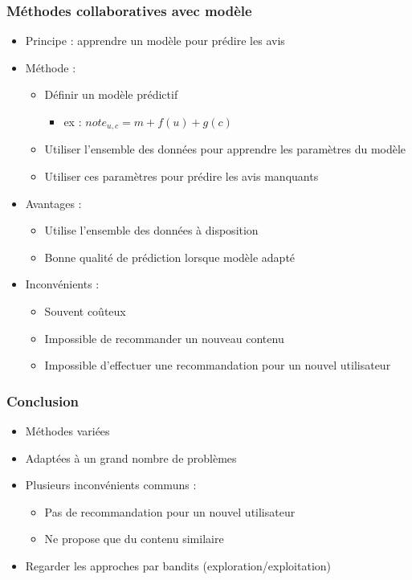 \documentclass[c]{beamer}
\begin{document}
\begin{frame}
    \frametitle{M\'ethodes collaboratives avec modèle}

    \begin{itemize}
        \item Principe : apprendre un modèle pour pr\'edire les avis
        \item<2-> M\'ethode :
            \begin{itemize}
                \item D\'efinir un modèle pr\'edictif
                    \begin{itemize}
                        \item ex : $note_{u,c} = m + f(u) + g(c)$
                    \end{itemize}
                \item Utiliser l'ensemble des donn\'ees pour apprendre
                    les paramètres du modèle
                \item Utiliser ces paramètres pour pr\'edire les
                    avis manquants
            \end{itemize}
        \item<3-> Avantages :
            \begin{itemize}
                \item Utilise l'ensemble des donn\'ees à disposition
                \item Bonne qualit\'e de pr\'ediction lorsque modèle adapt\'e
            \end{itemize}
        \item<4-> Inconv\'enients :
            \begin{itemize}
                \item Souvent coûteux
                \item Impossible de recommander un nouveau contenu
                \item Impossible d'effectuer une recommandation pour un
                    nouvel utilisateur
            \end{itemize}
    \end{itemize}
\end{frame}

\begin{frame}
    \frametitle{Conclusion}

    \begin{itemize}
        \item M\'ethodes vari\'ees
        \item Adapt\'ees à un grand nombre de problèmes
        \item Plusieurs inconv\'enients communs :
            \begin{itemize}
                \item Pas de recommandation pour un nouvel utilisateur
                \item Ne propose que du contenu similaire
            \end{itemize}
        \item Regarder les approches par bandits (exploration/exploitation)
    \end{itemize}
\end{frame}
\end{document}
